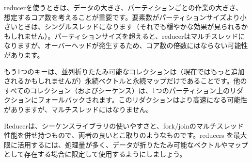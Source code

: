 reducerを使うときは、データの大きさ、パーティションごとの作業の大きさ、想定するコア数を考えることが重要です。要素数がパーティションサイズより小さいときは、シングルスレッドになります（それでも穏やかな効果が見られるかもしれません）。パーティションサイズを超えると、reducerはマルチスレッドになりますが、オーバーヘッドが発生するため、コア数の倍数にはならない可能性があります。

もう1つのキーは、並列折りたたみ可能なコレクションは（現在ではもっと追加されるかもしれませんが）永続ベクトルと永続マップだけであることです。他のすべてのコレクション（およびシーケンス）は、1つのパーティション上のリダクションにフォールバックされます。このリダクションはより高速になる可能性がありますが、マルチスレッドにはなりません。

Reducerは、シーケンスライブラリの使いやすさと、fork/joinのマルチスレッド性能を併せ持つもので、両者の良いとこ取りのようなものです。reducers を最大限に活用するには、処理量が多く、データが折りたたみ可能なベクトルやマップとして存在する場合に限定して使用するようにしましょう。